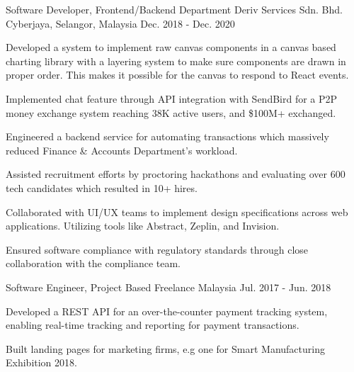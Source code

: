 \begin{cventries}
  \cventry
    {Software Developer, Frontend/Backend Department} %
    {Deriv Services Sdn. Bhd.} %
    {Cyberjaya, Selangor, Malaysia} %
    {Dec. 2018 - Dec. 2020} %
    {
      \begin{cvitems} %
        \item {Developed a system to implement raw canvas components in a canvas based charting library with a layering system to make sure components are drawn in proper order. This makes it possible for the canvas to respond to React events.}
        \item {Implemented chat feature through API integration with SendBird for a P2P money exchange system reaching 38K active users, and \$100M+ exchanged.}
        \item {Engineered a backend service for automating transactions which massively reduced Finance \& Accounts Department's workload.}
        \item {Assisted recruitment efforts by proctoring hackathons and evaluating over 600 tech candidates which resulted in 10+ hires.}
        \item {Collaborated with UI/UX teams to implement design specifications across web applications. Utilizing tools like Abstract, Zeplin, and Invision.}
        \item {Ensured software compliance with regulatory standards through close collaboration with the compliance team.}
      \end{cvitems}
    }

  \cventry
    {Software Engineer, Project Based} %
    {Freelance} %
    {Malaysia} %
    {Jul. 2017 - Jun. 2018} %
    {
      \begin{cvitems} %
        \item {Developed a REST API for an over-the-counter payment tracking system, enabling real-time tracking and reporting for payment transactions.}
        \item {Built landing pages for marketing firms, e.g one for Smart Manufacturing Exhibition 2018.}
      \end{cvitems}
    }

\end{cventries}
